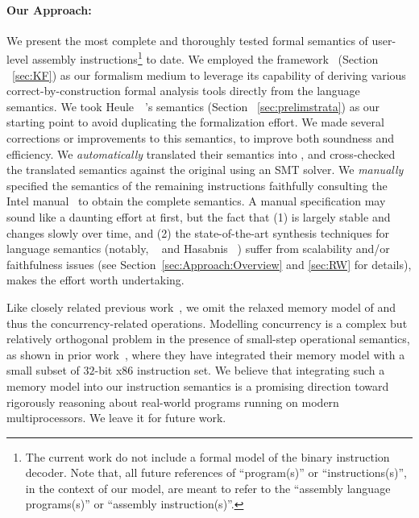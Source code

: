 \paragraph{Our Approach:}
%
We present the most complete and thoroughly tested formal semantics of user-level \ISA assembly instructions\footnote{The current work do not include a formal model of the binary instruction decoder. Note that, all future references of \ISA{} ``program(s)'' or ``instructions(s)'', in the context of our model, are meant to refer to the ``assembly language programs(s)'' or ``assembly instruction(s)''.} to date.
We employed the \K framework~\cite{k-primer-2013-v32} (Section ~\ref{sec:KF}) as our formalism medium to leverage its capability of deriving various correct-by-construction formal analysis tools directly from the language semantics.
We took Heule~\etal~\cite{Heule2016a}'s semantics (Section ~\ref{sec:prelimstrata}) as our starting point to avoid duplicating the formalization effort. %
We made several corrections or improvements to this semantics, to improve both soundness and efficiency.
We \emph{automatically} translated their semantics into \K, and cross-checked the translated semantics against the original using an SMT solver.
We \emph{manually} specified the semantics of the remaining instructions faithfully consulting the Intel manual~\cite{IntelManual} to obtain the complete semantics. A manual specification may sound like a daunting effort at first, but the fact that (1) \ISA is largely stable and changes slowly over time, and (2) the state-of-the-art synthesis techniques for language semantics (notably, \Strata~\cite{Heule2016a} and Hasabnis \etal~\cite{Hasabnis:ASPLOS16, Hasabnis:FSE16}) suffer from scalability and/or faithfulness issues (see Section~\ref{sec:Approach:Overview} and \ref{sec:RW} for details), makes the effort worth undertaking.





Like closely related previous work~\cite{Goel:FMCAD14,Heule2016a}, we omit the relaxed memory model of \ISA and thus the concurrency-related operations.
Modelling concurrency is a complex but relatively orthogonal problem in the presence of small-step operational semantics, as shown in prior work~\cite{Sarkar:POPL09,Owens:x86-TSO}, where they have integrated their memory model with a small subset of $32$-bit x86 instruction set.
We believe that integrating such a memory model into our instruction semantics is a promising direction toward rigorously reasoning about real-world programs running on modern multiprocessors. We leave it for future work.


